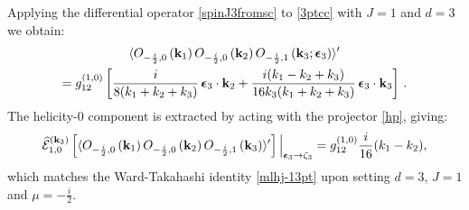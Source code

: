 \documentclass[11pt,a4paper]{article}
\begin{document}
Applying the differential operator \eqref{spinJ3fromsc} to \eqref{3ptcc} with $J=1$ and $d=3$ we obtain:
\begin{multline}\label{d3ml1}
    \langle O_{-\frac{i}{2},0}\left({\bf k}_1\right)O_{-\frac{i}{2},0}\left({\bf k}_2\right)O_{-\frac{i}{2},1}\left({\bf k}_3;\boldsymbol{\epsilon}_3\right)  \rangle^\prime\\=g^{\left(1,0\right)}_{12}\left[\frac{i}{8 (k_1+k_2+k_3)}\,\boldsymbol{\epsilon}_3\cdot {\bf k}_2+\frac{i(k_1-k_2+k_3)}{16 k_3 (k_1+k_2+k_3)}\,\boldsymbol{\epsilon}_3\cdot{\bf k}_3\right]\,.
\end{multline}
The helicity-0 component is extracted by acting with the projector \eqref{hp}, giving:
\begin{equation}
     \widehat{\mathcal{E}}^{({\bf k}_3)}_{1,0}\left[\langle O_{-\frac{i}{2},0}\left({\bf k}_1\right)O_{-\frac{i}{2},0}\left({\bf k}_2\right)O_{-\frac{i}{2},1}\left({\bf k}_3\right)  \rangle^\prime\right]\Big|_{\boldsymbol{\epsilon}_3 \to \zeta_3} = g^{\left(1,0\right)}_{12}\frac{i}{16} (k_1-k_2),
\end{equation}
which matches the Ward-Takahashi identity \eqref{mlhj-13pt} upon setting $d=3$, $J=1$ and $\mu=- \tfrac{i}{2}$.\\
\end{document}
